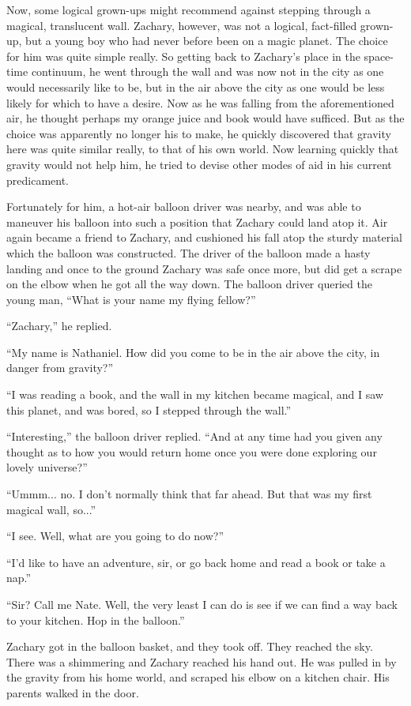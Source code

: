 Now, some logical grown-ups might recommend against stepping through a magical, translucent wall. Zachary, however, was not a logical, fact-filled grown-up, but a young boy who had never before been on a magic planet. The choice for him was quite simple really. So getting back to Zachary's place in the space-time continuum, he went through the wall and was now not in the city as one would necessarily like to be, but in the air above the city as one would be less likely for which to have a desire. Now as he was falling from the aforementioned air, he thought perhaps my orange juice and book would have sufficed. But as the choice was apparently no longer his to make, he quickly discovered that gravity here was quite similar really, to that of his own world. Now learning quickly that gravity would not help him, he tried to devise other modes of aid in his current predicament.

Fortunately for him, a hot-air balloon driver was nearby, and was able to maneuver his balloon into such a position that Zachary could land atop it. Air again became a friend to Zachary, and cushioned his fall atop the sturdy material which the balloon was constructed. The driver of the balloon made a hasty landing and once to the ground Zachary was safe once more, but did get a scrape on the elbow when he got all the way down. The balloon driver queried the young man, “What is your name my flying fellow?”

“Zachary,” he replied.

“My name is Nathaniel. How did you come to be in the air above the city, in danger from gravity?”

“I was reading a book, and the wall in my kitchen became magical, and I saw this planet, and was bored, so I stepped through the wall.”

“Interesting,” the balloon driver replied. “And at any time had you given any thought as to how you would return home once you were done exploring our lovely universe?”

“Ummm... no. I don't normally think that far ahead. But that was my first magical wall, so...”

“I see. Well, what are you going to do now?”

“I'd like to have an adventure, sir, or go back home and read a book or take a nap.”

“Sir? Call me Nate. Well, the very least I can do is see if we can find a way back to your kitchen. Hop in the balloon.”

Zachary got in the balloon basket, and they took off. They reached the sky. There was a shimmering and Zachary reached his hand out. He was pulled in by the gravity from his home world, and scraped his elbow on a kitchen chair. His parents walked in the door.
